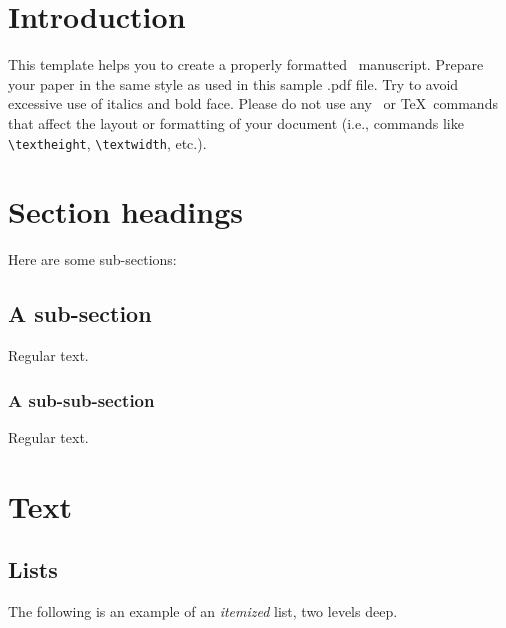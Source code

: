 \documentclass[aoas]{imsart}
\numberwithin{equation}{section}
\theoremstyle{plain}
\theoremstyle{remark}
\begin{document}
\hypertarget{introduction}{%
\section{Introduction}\label{introduction}}

This template helps you to create a properly formatted
\LaTeXe~manuscript. Prepare your paper in the same style as used in this
sample .pdf file. Try to avoid excessive use of italics and bold face.
Please do not use any \LaTeXe~or \TeX~commands that affect the layout or
formatting of your document (i.e., commands like \verb|\textheight|,
\verb|\textwidth|, etc.).

\hypertarget{section-headings}{%
\section{Section headings}\label{section-headings}}

Here are some sub-sections:

\hypertarget{a-sub-section}{%
\subsection{A sub-section}\label{a-sub-section}}

Regular text.

\hypertarget{a-sub-sub-section}{%
\subsubsection{A sub-sub-section}\label{a-sub-sub-section}}

Regular text.

\hypertarget{text}{%
\section{Text}\label{text}}

\hypertarget{lists}{%
\subsection{Lists}\label{lists}}

The following is an example of an \emph{itemized} list, two levels deep.
\end{document}
